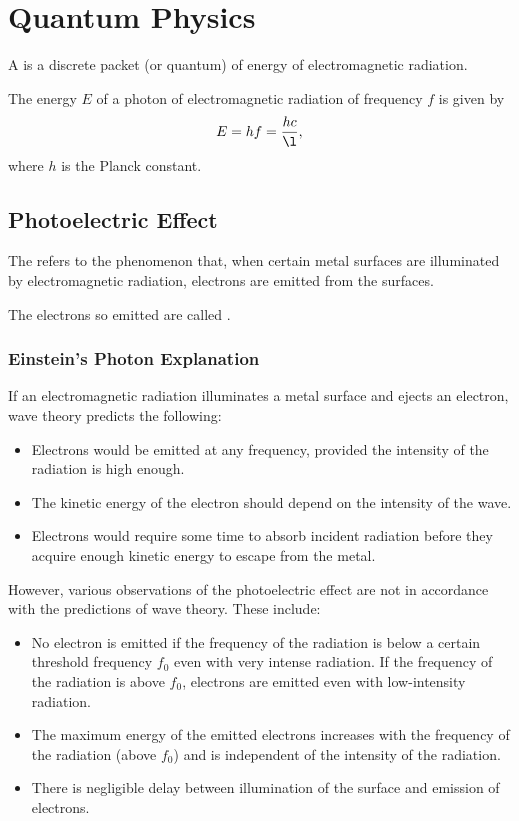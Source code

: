 \chapter{Quantum Physics}

\begin{definition}
    A  is a discrete packet (or quantum) of energy of electromagnetic radiation.
\end{definition}

\begin{proposition}
    The energy $E$ of a photon of electromagnetic radiation of frequency $f$ is given by \[E = hf = \frac{hc}{\l},\] where $h$ is the Planck constant.
\end{proposition}

\section{Photoelectric Effect}

\begin{definition}
    The  refers to the phenomenon that, when certain metal surfaces are illuminated by electromagnetic radiation, electrons are emitted from the surfaces.
\end{definition}

The electrons so emitted are called .

\subsection{Einstein's Photon Explanation}

If an electromagnetic radiation illuminates a metal surface and ejects an electron, wave theory predicts the following:
\begin{itemize}
    \item Electrons would be emitted at any frequency, provided the intensity of the radiation is high enough.
    \item The kinetic energy of the electron should depend on the intensity of the wave.
    \item Electrons would require some time to absorb incident radiation before they acquire enough kinetic energy to escape from the metal.
\end{itemize}

However, various observations of the photoelectric effect are not in accordance with the predictions of wave theory. These include:
\begin{itemize}
    \item No electron is emitted if the frequency of the radiation is below a certain threshold frequency $f_0$ even with very intense radiation. If the frequency of the radiation is above $f_0$, electrons are emitted even with low-intensity radiation.
    \item The maximum energy of the emitted electrons increases with the frequency of the radiation (above $f_0$) and is independent of the intensity of the radiation.
    \item There is negligible delay between illumination of the surface and emission of electrons.
\end{itemize}

